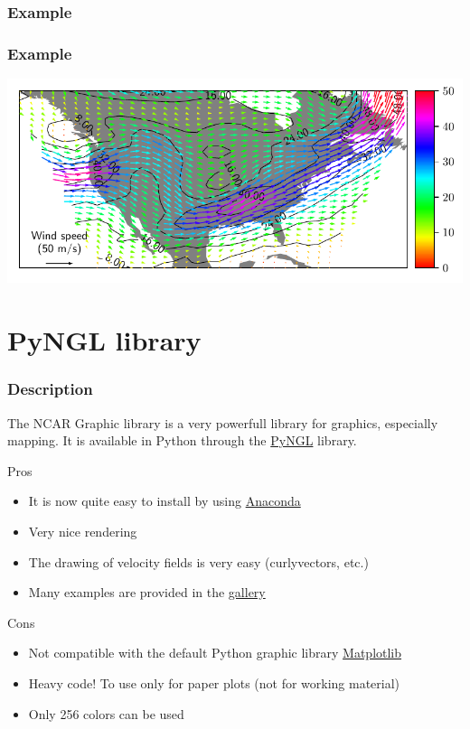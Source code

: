 \documentclass{beamer}
\begin{document}
\begin{frame}[fragile]
\frametitle{Example}

\end{frame}

\begin{frame}[fragile]
\frametitle{Example}
    \begin{center}
        \includegraphics[scale=0.8]{progs/contour_quiver.pdf}
    \end{center}
\end{frame}


\section{PyNGL library}

\begin{frame}[fragile]
\frametitle{Description}
    The NCAR Graphic library is a very powerfull library for graphics, especially mapping. It is available in Python through the \textcolor{blue}{\href{https://www.pyngl.ucar.edu/}{PyNGL}} library.
    \footnotesize{
\begin{block}{Pros}
    \begin{itemize}
        \item{It is now quite easy to install by using \href{https://www.anaconda.com/}{Anaconda}}
        \item{Very nice rendering}
        \item{The drawing of velocity fields is very easy (curlyvectors, etc.)}
        \item{Many examples are provided in the \href{https://www.pyngl.ucar.edu/Examples/gallery.shtml}{gallery}}
    \end{itemize}
\end{block}
\begin{alertblock}{Cons}
    \begin{itemize}
        \item{Not compatible with the default Python graphic library \href{https://matplotlib.org/}{Matplotlib}}
        \item{Heavy code! To use only for paper plots (not for working material)}
        \item{Only 256 colors can be used}
    \end{itemize}
\end{alertblock}
}
\end{frame}
\end{document}
